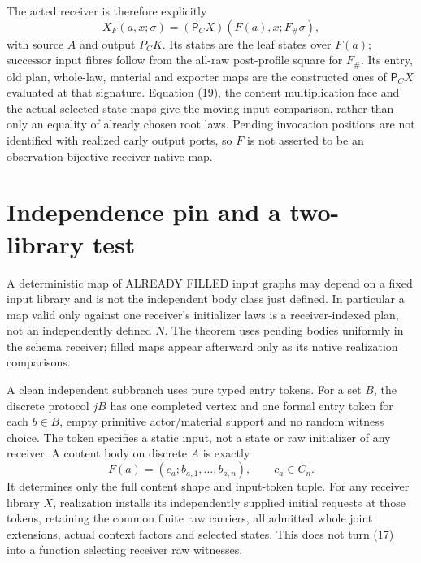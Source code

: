 \documentclass[11pt]{article}
\begin{document}
The acted receiver is therefore explicitly
\[
 X_F(a,x;\sigma)=(\mathsf P_CX)(F(a),x;F_\#\sigma),       \tag{20}
\]
with source $A$ and output $P_CK$. Its states are the leaf states over $F(a)$; successor input fibres follow from the all-raw post-profile square for $F_\#$. Its entry, old plan, whole-law, material and exporter maps are the constructed ones of $\mathsf P_CX$ evaluated at that signature. Equation (19), the content multiplication face and the actual selected-state maps give the moving-input comparison, rather than only an equality of already chosen root laws. Pending invocation positions are not identified with realized early output ports, so $F$ is not asserted to be an observation-bijective receiver-native map.

\section{Independence pin and a two-library test}
A deterministic map of ALREADY FILLED input graphs may depend on a fixed input library and is not the independent body class just defined. In particular a map valid only against one receiver's initializer laws is a receiver-indexed plan, not an independently defined $N$. The theorem uses pending bodies uniformly in the schema receiver; filled maps appear afterward only as its native realization comparisons.

A clean independent subbranch uses pure typed entry tokens. For a set $B$, the discrete protocol $jB$ has one completed vertex and one formal entry token for each $b\in B$, empty primitive actor/material support and no random witness choice. The token specifies a static input, not a state or raw initializer of any receiver. A content body on discrete $A$ is exactly
\[
              F(a)=(c_a;b_{a,1},\ldots,b_{a,n}),\qquad c_a\in C_n.
                                                               \tag{17}
\]
It determines only the full content shape and input-token tuple. For any receiver library $X$, realization installs its independently supplied initial requests at those tokens, retaining the common finite raw carriers, all admitted whole joint extensions, actual context factors and selected states. This does not turn (17) into a function selecting receiver raw witnesses.
\end{document}
